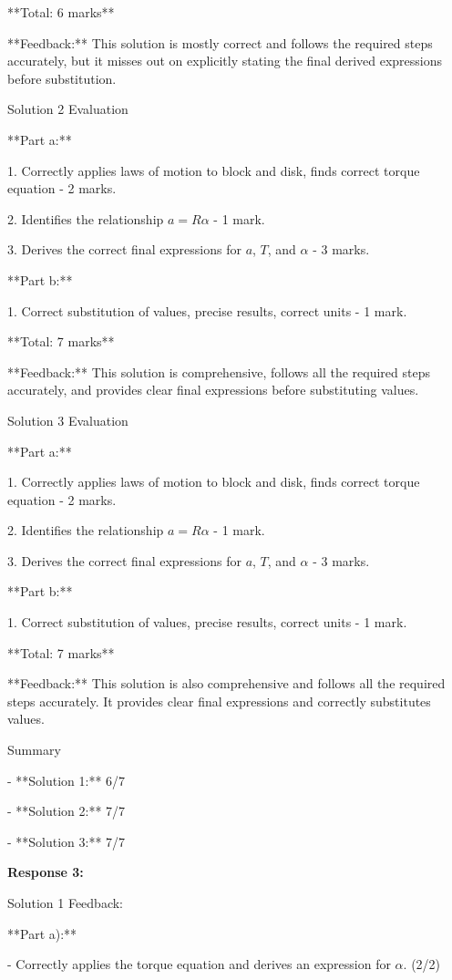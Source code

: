 \documentclass[a4paper,11pt]{article}
\begin{document}
**Total: 6 marks**  

**Feedback:** This solution is mostly correct and follows the required steps accurately, but it misses out on explicitly stating the final derived expressions before substitution.

Solution 2 Evaluation

**Part a:**

1. Correctly applies laws of motion to block and disk, finds correct torque equation - 2 marks.

2. Identifies the relationship \(a = R\alpha\) - 1 mark.

3. Derives the correct final expressions for \(a\), \(T\), and \(\alpha\) - 3 marks.

**Part b:**

1. Correct substitution of values, precise results, correct units - 1 mark.

**Total: 7 marks**  

**Feedback:** This solution is comprehensive, follows all the required steps accurately, and provides clear final expressions before substituting values.

Solution 3 Evaluation

**Part a:**

1. Correctly applies laws of motion to block and disk, finds correct torque equation - 2 marks.

2. Identifies the relationship \(a = R\alpha\) - 1 mark.

3. Derives the correct final expressions for \(a\), \(T\), and \(\alpha\) - 3 marks.

**Part b:**

1. Correct substitution of values, precise results, correct units - 1 mark.

**Total: 7 marks**  

**Feedback:** This solution is also comprehensive and follows all the required steps accurately. It provides clear final expressions and correctly substitutes values.

Summary

- **Solution 1:** 6/7

- **Solution 2:** 7/7

- **Solution 3:** 7/7

\bigskip
\textbf{Response 3:}

Solution 1 Feedback:

**Part a):**

- Correctly applies the torque equation and derives an expression for \(\alpha\). (2/2)
\end{document}
